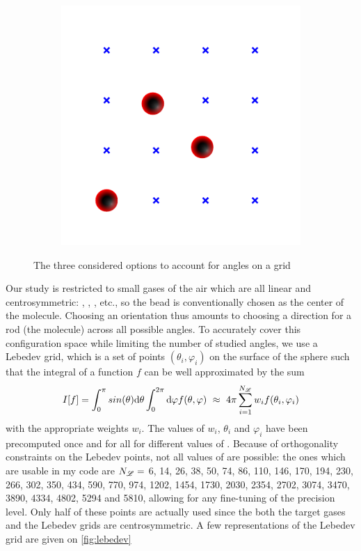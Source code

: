 \documentclass[main.tex]{subfiles}
\begin{document}
\begin{figure}
\begin{subfigure}{0.33\linewidth}
	\end{subfigure}\hfill%
	\begin{subfigure}{0.33\linewidth}
		\centering
		\includegraphics[width=\linewidth]{figures/gcmc/gridMC_optionC.pdf}
	\end{subfigure}\hfill
	\caption{The three considered options to account for angles on a grid}\label{fig:3options}
\end{figure}

Our study is restricted to small gases of the air which are all linear and centrosymmetric: , , , etc., so the bead is conventionally chosen as the center of the molecule. Choosing an orientation thus amounts to choosing a direction for a rod (the molecule) across all possible angles. To accurately cover this configuration space while limiting the number of studied angles, we use a Lebedev grid, which is a set of \Nleb points $(\theta_i,\varphi_i)$ on the surface of the sphere such that the integral of a function $f$ can be well approximated by the sum
\[I[f] = \int_0^\pi sin(\theta)\text d\theta \int_0^{2\pi}\text d\varphi f(\theta, \varphi)\ \approx\ 4\pi\sum_{i=1}^{N_{\mathscr L}} w_if(\theta_i,\varphi_i)\]
with the appropriate weights $w_i$. The values of $w_i$, $\theta_i$ and $\varphi_i$ have been precomputed once and for all for different values of \Nleb. Because of orthogonality constraints on the Lebedev points, not all values of \Nleb are possible: the ones which are usable in my code are $N_{\mathscr L} =$ 6, 14, 26, 38, 50, 74, 86, 110, 146, 170, 194, 230, 266, 302, 350, 434, 590, 770, 974, 1202, 1454, 1730, 2030, 2354, 2702, 3074, 3470, 3890, 4334, 4802, 5294 and 5810, allowing for any fine-tuning of the precision level. Only half of these points are actually used since the both the target gases and the Lebedev grids are centrosymmetric. A few representations of the Lebedev grid are given on \cref{fig:lebedev}
\end{document}
